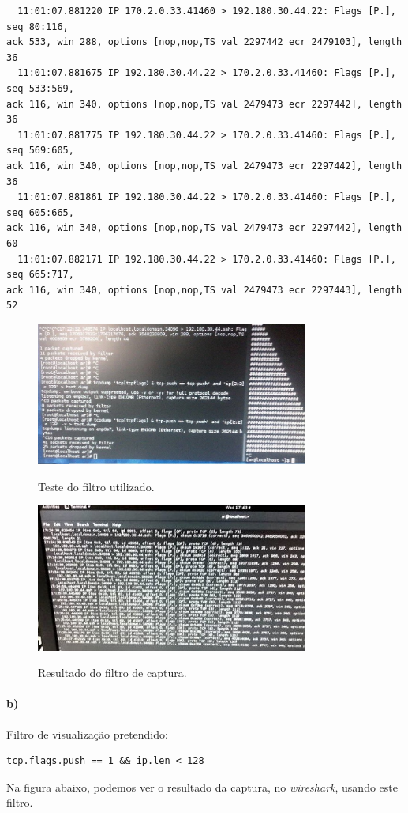 \begin{verbatim}
  11:01:07.881220 IP 170.2.0.33.41460 > 192.180.30.44.22: Flags [P.], seq 80:116, 
ack 533, win 288, options [nop,nop,TS val 2297442 ecr 2479103], length 36
  11:01:07.881675 IP 192.180.30.44.22 > 170.2.0.33.41460: Flags [P.], seq 533:569, 
ack 116, win 340, options [nop,nop,TS val 2479473 ecr 2297442], length 36
  11:01:07.881775 IP 192.180.30.44.22 > 170.2.0.33.41460: Flags [P.], seq 569:605, 
ack 116, win 340, options [nop,nop,TS val 2479473 ecr 2297442], length 36
  11:01:07.881861 IP 192.180.30.44.22 > 170.2.0.33.41460: Flags [P.], seq 605:665, 
ack 116, win 340, options [nop,nop,TS val 2479473 ecr 2297442], length 60
  11:01:07.882171 IP 192.180.30.44.22 > 170.2.0.33.41460: Flags [P.], seq 665:717, 
ack 116, win 340, options [nop,nop,TS val 2479473 ecr 2297443], length 52
\end{verbatim}
\newpage
\begin{figure}[h]
\centering
\includegraphics[width=0.8\textwidth]{3_a_filtro.png}
\label{fig:filtro}
\caption{Teste do filtro utilizado.}
\end{figure}

\begin{figure}[h]
\centering
\includegraphics[width=0.8\textwidth]{3_a_resultado_do_tcpdump.png}
\label{fig:tcpdump}
\caption{Resultado do filtro de captura.}
\end{figure}

\paragraph{b)}
Filtro de visualização pretendido:
\begin{verbatim}
tcp.flags.push == 1 && ip.len < 128
\end{verbatim}
Na figura abaixo, podemos ver o resultado da captura, no \emph{wireshark}, usando este filtro.

